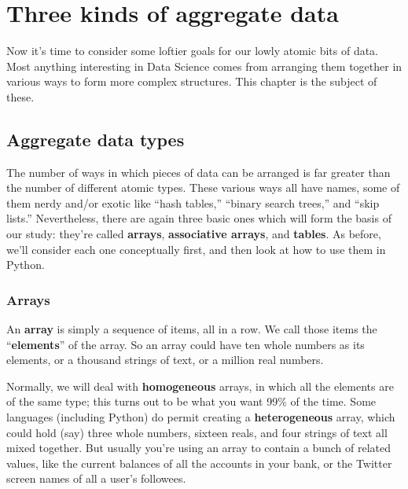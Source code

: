
%

\chapter[Three kinds of aggregate data]{\huge Three kinds of aggregate data}
\label{ch:aggregateData}

Now it's time to consider some loftier goals for our lowly atomic bits of data.
Most anything interesting in Data Science comes from arranging them together in
various ways to form more complex structures. This chapter is the subject of
these.

\section{Aggregate data types}

The number of ways in which pieces of data can be arranged is far greater than
the number of different atomic types. These various ways all have names, some
of them nerdy and/or exotic like ``hash tables,'' ``binary search trees,'' and
``skip lists.'' Nevertheless, there are again three basic ones which will form
the basis of our study: they're called \textbf{arrays}, \textbf{associative
arrays}, and \textbf{tables}. As before, we'll consider each one conceptually
first, and then look at how to use them in Python.

\subsection{Arrays}

An \textbf{array} is simply a sequence of items, all in a row. We call those
items the ``\textbf{elements}'' of the array. So an array could have ten whole
numbers as its elements, or a thousand strings of text, or a million real
numbers.

Normally, we will deal with \textbf{homogeneous} arrays, in which all the
elements are of the same type; this turns out to be what you want 99\% of the
time. Some languages (including Python) do permit creating a
\textbf{heterogeneous} array, which could hold (say) three whole numbers,
sixteen reals, and four strings of text all mixed together. But usually you're
using an array to contain a bunch of related values, like the current balances
of all the accounts in your bank, or the Twitter screen names of all a user's
followees.

